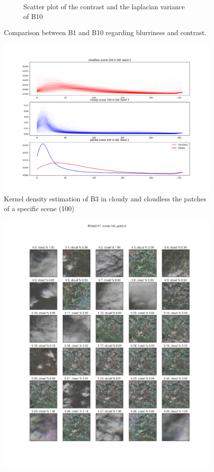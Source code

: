 \documentclass[../main.tex]{subfiles}
\begin{document}
\begin{appendices}
\begin{figure}[H]
\begin{subfigure}[b]{0.85\textwidth}
		\caption{Scatter plot of the contrast and the laplacian variance of B10}		
	\end{subfigure}
	\caption{Comparison between B1 and B10 regarding blurriness and contrast.}
	\label{fig:eda-comparison-b1-b10}
\end{figure}
\begin{figure}[H]
	\centering
	\includegraphics[width=16cm]{imgs/eda/b3-kde}
	\caption{Kernel density estimation of B3 in cloudy and cloudless the patches of a specific scene (100)}
	\label{fig:eda-b3-kde}
\end{figure}
\begin{figure}[H]
	\centering
	\includegraphics[width=16cm]{imgs/eda/merge/cloud-percentages-patch-images}

\end{figure}
\end{appendices}
\end{document}
